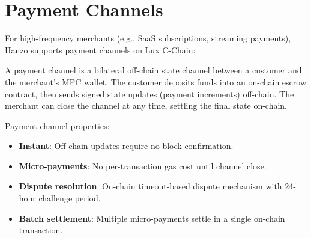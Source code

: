 \section{Payment Channels}

\label{sec:channels}

For high-frequency merchants (e.g., SaaS subscriptions, streaming
payments), Hanzo supports payment channels on Lux C-Chain:

\begin{definition}
A payment channel is a bilateral off-chain state channel between a
customer and the merchant's MPC wallet. The customer deposits funds into
an on-chain escrow contract, then sends signed state updates (payment
increments) off-chain. The merchant can close the channel at any time,
settling the final state on-chain.
\end{definition}

Payment channel properties:
\begin{itemize}[leftmargin=1.4em]
    \item \textbf{Instant}: Off-chain updates require no block
    confirmation.
    \item \textbf{Micro-payments}: No per-transaction gas cost until
    channel close.
    \item \textbf{Dispute resolution}: On-chain timeout-based dispute
    mechanism with 24-hour challenge period.
    \item \textbf{Batch settlement}: Multiple micro-payments settle in
    a single on-chain transaction.
\end{itemize}

